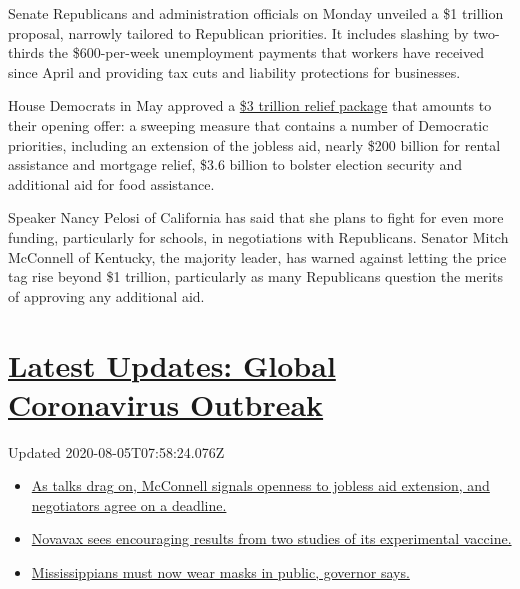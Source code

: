 Senate Republicans and administration officials on Monday unveiled a \$1
trillion proposal, narrowly tailored to Republican priorities. It
includes slashing by two-thirds the \$600-per-week unemployment payments
that workers have received since April and providing tax cuts and
liability protections for businesses.

House Democrats in May approved a
\href{https://www.congress.gov/116/bills/hr6800/BILLS-116hr6800ih.pdf}{\$3
trillion relief package} that amounts to their opening offer: a sweeping
measure that contains a number of Democratic priorities, including an
extension of the jobless aid, nearly \$200 billion for rental assistance
and mortgage relief, \$3.6 billion to bolster election security and
additional aid for food assistance.

Speaker Nancy Pelosi of California has said that she plans to fight for
even more funding, particularly for schools, in negotiations with
Republicans. Senator Mitch McConnell of Kentucky, the majority leader,
has warned against letting the price tag rise beyond \$1 trillion,
particularly as many Republicans question the merits of approving any
additional aid.

\hypertarget{latest-updates-global-coronavirus-outbreak}{%
\section{\texorpdfstring{\href{https://www.nytimes.com/2020/08/04/world/coronavirus-cases.html?action=click\&pgtype=Article\&state=default\&region=MAIN_CONTENT_1\&context=storylines_live_updates}{Latest
Updates: Global Coronavirus
Outbreak}}{Latest Updates: Global Coronavirus Outbreak}}\label{latest-updates-global-coronavirus-outbreak}}

Updated 2020-08-05T07:58:24.076Z

\begin{itemize}
\tightlist
\item
  \href{https://www.nytimes.com/2020/08/04/world/coronavirus-cases.html?action=click\&pgtype=Article\&state=default\&region=MAIN_CONTENT_1\&context=storylines_live_updates\#link-762df92}{As
  talks drag on, McConnell signals openness to jobless aid extension,
  and negotiators agree on a deadline.}
\item
  \href{https://www.nytimes.com/2020/08/04/world/coronavirus-cases.html?action=click\&pgtype=Article\&state=default\&region=MAIN_CONTENT_1\&context=storylines_live_updates\#link-1228a480}{Novavax
  sees encouraging results from two studies of its experimental
  vaccine.}
\item
  \href{https://www.nytimes.com/2020/08/04/world/coronavirus-cases.html?action=click\&pgtype=Article\&state=default\&region=MAIN_CONTENT_1\&context=storylines_live_updates\#link-794484ed}{Mississippians
  must now wear masks in public, governor says.}
\end{itemize}


